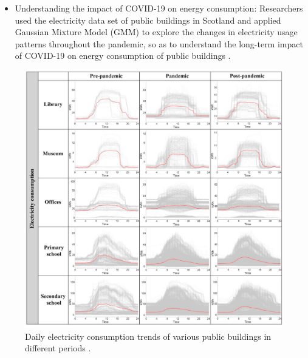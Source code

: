\documentclass[12pt]{article}
\providecommand{\tightlist}{%
  \setlength{\itemsep}{0pt}\setlength{\parskip}{0pt}}
\begin{document}
\label{sec:examples}

\begin{itemize}
\tightlist
\item
  Understanding the impact of COVID-19 on energy consumption:
  Researchers used the electricity data set of public buildings in
  Scotland and applied Gaussian Mixture Model (GMM) to explore the
  changes in electricity usage patterns throughout the pandemic, so as
  to understand the long-term impact of COVID-19 on energy consumption
  of public buildings \citep{huang2023gaussian}.
\end{itemize}

\begin{figure}
\centering
\includegraphics{1.jpg}
\caption{Daily electricity consumption trends of various public
buildings in different periods \citep{huang2023gaussian}.}
\end{figure}
\end{document}

